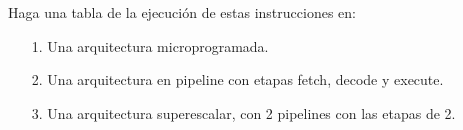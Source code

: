 \documentclass[dcc]{fcfmcourse}
\begin{document}
\begin{problems}
Haga una tabla de la ejecución de estas instrucciones en:
\begin{enumerate}
    \item[1.] Una arquitectura microprogramada.
    \item[2.] Una arquitectura en pipeline con etapas fetch, decode y execute.
    \item[3.] Una arquitectura superescalar, con 2 pipelines con las etapas de 2.
\end{enumerate}

\end{problems}
\end{document}
